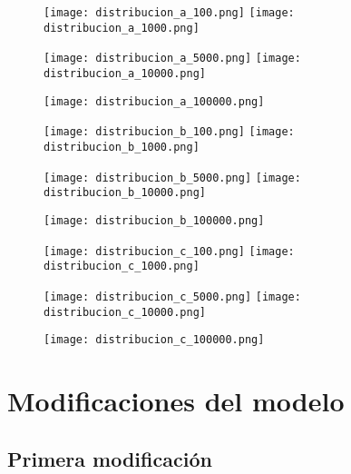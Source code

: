 \newpage

\begin{figure}[h!]
	\texttt{[image: distribucion\_a\_100.png]}
	\texttt{[image: distribucion\_a\_1000.png]}
\end{figure}
\begin{figure}[h!]
	\texttt{[image: distribucion\_a\_5000.png]}
	\texttt{[image: distribucion\_a\_10000.png]}
\end{figure}

\newpage

\begin{figure}[h!]
	\texttt{[image: distribucion\_a\_100000.png]}
\end{figure}

\newpage

\begin{figure}[h!]
	\texttt{[image: distribucion\_b\_100.png]}
	\texttt{[image: distribucion\_b\_1000.png]}
\end{figure}

\newpage

\begin{figure}[h!]
	\texttt{[image: distribucion\_b\_5000.png]}
	\texttt{[image: distribucion\_b\_10000.png]}
\end{figure}

\pagebreak

\begin{figure}[h!]
	\texttt{[image: distribucion\_b\_100000.png]}
\end{figure}
\begin{figure}[h!]
	\texttt{[image: distribucion\_c\_100.png]}
	\texttt{[image: distribucion\_c\_1000.png]}
\end{figure}
\begin{figure}[h!]
	\texttt{[image: distribucion\_c\_5000.png]}
	\texttt{[image: distribucion\_c\_10000.png]}
\end{figure}
\begin{figure}[h!]
	\texttt{[image: distribucion\_c\_100000.png]}
\end{figure}

\newpage

\section{Modificaciones del modelo}

\subsection{Primera modificación}

